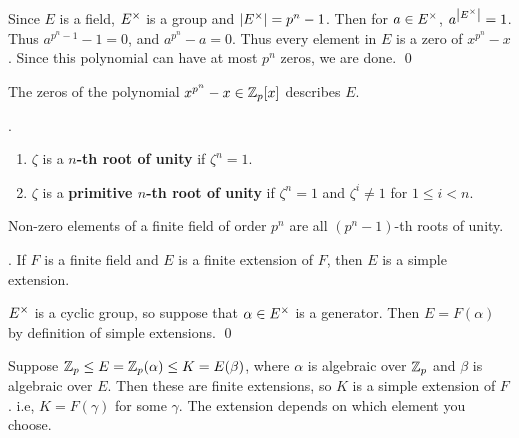 \pf Since \(E\) is a field, \(E^\times\) is a group and \(\left| E^\times \right| = p^n - 1\). Then for \(a \in E^\times\), \(a^{\left| E^\times \right|} = 1\). Thus \(a^{p^n - 1} - 1 = 0\), and \(a^{p^n} - a = 0\). Thus every element in \(E\) is a zero of \(x^{p^n} - x\). Since this polynomial can have at most \(p^n\) zeros, we are done. \qed

The zeros of the polynomial \(x^{p^n} - x \in \mathbb{Z}_p[x]\) describes \(E\).

. 
\begin{enumerate}
    \item \(\zeta\) is a \textbf{\(n\)-th root of unity} if \(\zeta^n = 1\).
    \item \(\zeta\) is a \textbf{primitive \(n\)-th root of unity} if \(\zeta^n = 1\) and \(\zeta^i \neq 1\) for \(1 \leq i < n\).
\end{enumerate}

Non-zero elements of a finite field of order \(p^n\) are all \((p^n - 1)\)-th roots of unity.

\cor. If \(F\) is a finite field and \(E\) is a finite extension of \(F\), then \(E\) is a simple extension.

\pf \(E^\times\) is a cyclic group, so suppose that \(\alpha \in E^\times\) is a generator. Then \(E = F(\alpha)\) by definition of simple extensions. \qed

Suppose \(\mathbb{Z}_p \leq E = \mathbb{Z}_p(\alpha) \leq K = E(\beta)\), where \(\alpha\) is algebraic over \(\mathbb{Z}_p\) and \(\beta\) is algebraic over \(E\). Then these are finite extensions, so \(K\) is a simple extension of \(F\). i.e, \(K = F(\gamma)\) for some \(\gamma\). The extension depends on which element you choose.

\pagebreak

